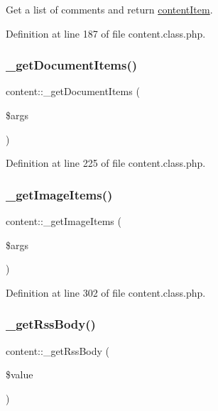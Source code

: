 Get a list of comments and return \hyperlink{classcontentItem}{content\+Item}. 



Definition at line 187 of file content.\+class.\+php.

\mbox{\label{classcontent_ac3e0ed7e0c14712bd93e68cae1603e2f}} 
\subsubsection{\texorpdfstring{\+\_\+get\+Document\+Items()}{\_getDocumentItems()}}
{\footnotesize\ttfamily content\+::\+\_\+get\+Document\+Items (\begin{DoxyParamCaption}\item[{}]{\$args }\end{DoxyParamCaption})}



Definition at line 225 of file content.\+class.\+php.

\mbox{\label{classcontent_abdff6ddbe036e410913b5da1b9a5ce1b}} 
\subsubsection{\texorpdfstring{\+\_\+get\+Image\+Items()}{\_getImageItems()}}
{\footnotesize\ttfamily content\+::\+\_\+get\+Image\+Items (\begin{DoxyParamCaption}\item[{}]{\$args }\end{DoxyParamCaption})}



Definition at line 302 of file content.\+class.\+php.

\mbox{\label{classcontent_a75dcd12f149001ea88ceb13a286ce040}} 
\subsubsection{\texorpdfstring{\+\_\+get\+Rss\+Body()}{\_getRssBody()}}
{\footnotesize\ttfamily content\+::\+\_\+get\+Rss\+Body (\begin{DoxyParamCaption}\item[{}]{\$value }\end{DoxyParamCaption})}



